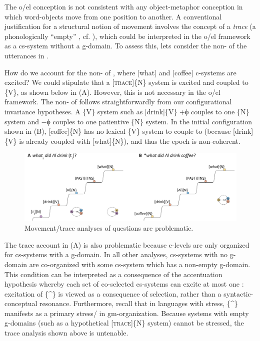   The o/el conception is not consistent with any object-metaphor conception in which word-objects move from one position to another. A conventional justification for a structural notion of movement involves the concept of a \textit{trace} (a phonologically “empty” , cf. \citealt{Chomsky1965}), which could be interpreted in the o/el framework as a cs-system without a g-domain. To assess this, lets consider the non- of the utterances in .

\ea\label{ex:7:19}
  \label{ex:7:19a}
  \label{ex:7:19b}
\z
\z

  How do we account for the non- of , where [what] and [coffee] c-systems are excited?  We could stipulate that a [\textsc{trace}]\{N\} system is excited and coupled to \{V\}, as shown below in {}(A). However, this is not necessary in the o/el framework. The non- of  follows straightforwardly from our configurational invariance hypotheses. A  \{V\} system such as [drink]\{V\} +ϕ couples to one  \{N\} system and −ϕ couples to one patientive \{N\} system. In the initial configuration shown in {}(B), [coffee]\{N\} has no lexical \{V\} system to couple to (because [drink]\{V\} is already coupled with [what]\{N\}), and thus the epoch is non-coherent.

  
\begin{figure}
\includegraphics[width=\textwidth]{figures/Tilsen-img161.png}
\caption{Movement/trace analyses of questions are problematic.}
\label{fig:7:17}
\end{figure}
 

  The trace account in {}(A) is also problematic because e-levels are only organized for cs-systems with a g-domain. In all other analyses, cs-systems with no g-domain are co-organized with some cs-system which has a non-empty g-domain. This condition can be interpreted as a consequence of the accentuation hypothesis whereby each set of co-selected cs-systems can excite at most one : excitation of \{\^{}\} is viewed as a consequence of selection, rather than a syntactic-conceptual resonance. Furthermore, recall that in languages with stress, \{\^{}\} manifests as a primary stress/ in gm-or\-ga\-ni\-za\-tion. Because systems with empty g-domains (such as a hypothetical [\textsc{trace}]\{N\} system) cannot be stressed, the trace analysis shown above is untenable.

